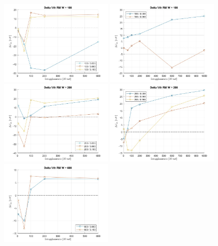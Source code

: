 \documentclass[12pt, letterpaper]{book}
\begin{document}
\begin{figure}[H]
  \centering
  \includegraphics[width=0.49\textwidth]{sovrapposizione-deltaVth-RM-N100}
  \includegraphics[width=0.49\textwidth]{sovrapposizione-deltaVth-RM-P100}
  \includegraphics[width=0.49\textwidth]{sovrapposizione-deltaVth-RM-N200}
  \includegraphics[width=0.49\textwidth]{sovrapposizione-deltaVth-RM-P200}
  \includegraphics[width=0.49\textwidth]{sovrapposizione-deltaVth-RM-N600}

\end{figure}
\end{document}
